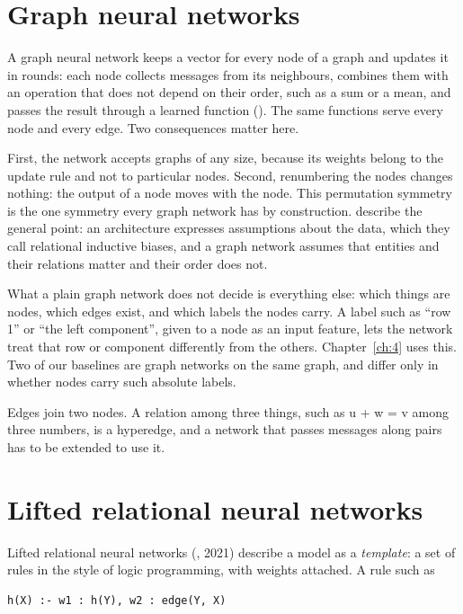 \section{Graph neural networks}\label{sec:2.2}

A graph neural network keeps a vector for every node of a graph and updates it in rounds: each node collects messages from its neighbours, combines them with an operation that does not depend on their order, such as a sum or a mean, and passes the result through a learned function (\citealp{zhou2020graph}). The same functions serve every node and every edge. Two consequences matter here.

First, the network accepts graphs of any size, because its weights belong to the update rule and not to particular nodes. Second, renumbering the nodes changes nothing: the output of a node moves with the node. This permutation symmetry is the one symmetry every graph network has by construction. \citet{battaglia2018relational} describe the general point: an architecture expresses assumptions about the data, which they call relational inductive biases, and a graph network assumes that entities and their relations matter and their order does not.

What a plain graph network does not decide is everything else: which things are nodes, which edges exist, and which labels the nodes carry. A label such as ``row 1'' or ``the left component'', given to a node as an input feature, lets the network treat that row or component differently from the others. Chapter~\ref{ch:4} uses this. Two of our baselines are graph networks on the same graph, and differ only in whether nodes carry such absolute labels.

Edges join two nodes. A relation among three things, such as u + w = v among three numbers, is a hyperedge, and a network that passes messages along pairs has to be extended to use it.

\section{Lifted relational neural networks}\label{sec:2.3}

Lifted relational neural networks (\citealp{sourek2018lifted}, 2021) describe a model as a \emph{template}: a set of rules in the style of logic programming, with weights attached. A rule such as

\begin{Verbatim}[fontsize=\small,breaklines]
h(X) :- w1 : h(Y), w2 : edge(Y, X)
\end{Verbatim}

